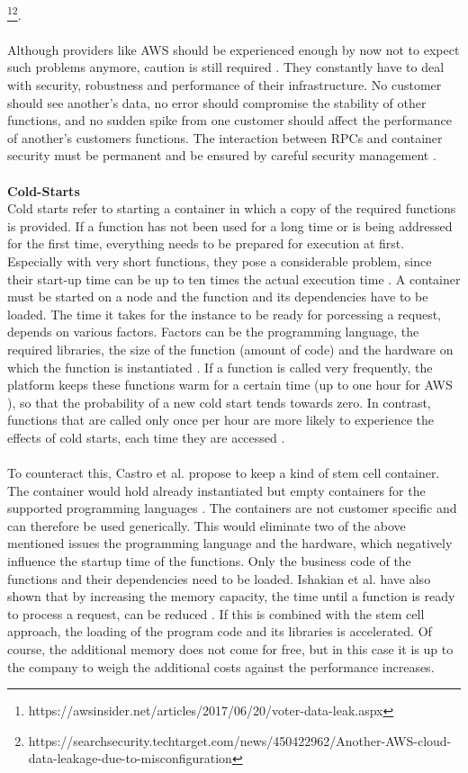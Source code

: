 \documentclass[a4paper,twoside,11pt, pagesize]{scrartcl}
\begin{document}
\begin{spacing}{1.2}
\footnote{https://awsinsider.net/articles/2017/06/20/voter-data-leak.aspx}\footnote{https://searchsecurity.techtarget.com/news/450422962/Another-AWS-cloud-data-leakage-due-to-misconfiguration}.\\\\ Although providers like AWS should be experienced enough by now not to expect such problems anymore, caution is still required \cite{fowler2018serverless}. They constantly have to deal with security, robustness and performance of their infrastructure. No customer should see another's data, no error should compromise the stability of other functions, and no sudden spike from one customer should affect the performance of another's customers functions. The interaction between RPCs and container security must be permanent and be ensured by careful security management \cite{mcgrath2017serverless}.\\\\ \textbf{Cold-Starts}\\ Cold starts refer to starting a container in which a copy of the required functions is provided. If a function has not been used for a long time or is being addressed for the first time, everything needs to be prepared for execution at first. Especially with very short functions, they pose a considerable problem, since their start-up time can be up to ten times the actual execution time \cite{shahrad2019architectural}. A container must be started on a node and the function and its dependencies have to be loaded. The time it takes for the instance to be ready for porcessing a request, depends on various factors. Factors can be the programming language, the required libraries, the size of the function (amount of code) and the hardware on which the function is instantiated \cite{shafiei2020serverless} \cite{jonas2019cloud}. If a function is called very frequently, the platform keeps these functions \glqq warm\grqq{} for a certain time (up to one hour for AWS \cite{roberts2017serverless}), so that the probability of a new cold start tends towards zero. In contrast, functions that are called only once per hour are more likely to experience the effects of cold starts, each time they are accessed \cite{roberts2017serverless}.\\\\ To counteract this, Castro et al. propose to keep a kind of stem cell container. The container would hold already instantiated but empty containers for the supported programming languages \cite{castro2019server}. The containers are not customer specific and can therefore be used generically. This would eliminate two of the above mentioned issues the programming language and the hardware, which negatively influence the startup time of the functions. Only the business code of the functions and their dependencies need to be loaded. Ishakian et al. have also shown that by increasing the memory capacity, the time until a function is ready to process a request, can be reduced \cite{ishakian2018serving}. If this is combined with the stem cell approach, the loading of the program code and its libraries is accelerated. Of course, the additional memory does not come for free, but in this case it is up to the company to weigh the additional costs against the performance increases.

\end{spacing}
\end{document}
